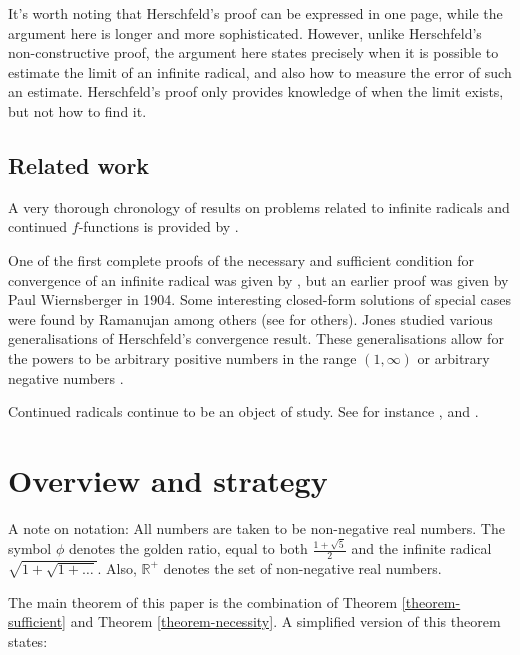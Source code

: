 \documentclass[
]{article}
\theoremstyle{theorem}
\theoremstyle{lemma}
\theoremstyle{corollary}
\theoremstyle{remark}
\theoremstyle{definition}
\begin{document}
It's worth noting that Herschfeld's proof can be expressed in one page, while the argument here is longer and more sophisticated. However, unlike Herschfeld's non-constructive proof, the argument here states precisely when it is possible to estimate the limit of an infinite radical, and also how to measure the error of such an estimate. Herschfeld's proof only provides knowledge of when the limit exists, but not how to find it.

\hypertarget{related-work}{%
\subsection{Related work}\label{related-work}}

A very thorough chronology of results on problems related to infinite radicals and continued \(f\)-functions is provided by \cite{Jones}.

One of the first complete proofs of the necessary and sufficient condition for convergence of an infinite radical was given by \cite{Hersch}, but an earlier proof was given by Paul Wiernsberger in 1904. Some interesting closed-form solutions of special cases were found by Ramanujan among others \cite{ramanujan1911} (see \cite{Jones} for others). Jones studied various generalisations of Herschfeld's convergence result. These generalisations allow for the powers to be arbitrary positive numbers \cite{Jones1995} in the range \((1,\infty)\) or arbitrary negative numbers \cite{Jones2015} .

Continued radicals continue to be an object of study. See for instance \cite{aoki2016}, \cite{doi:10.4169/amer.math.monthly.121.01.045} and \cite{Convergencemonotonicityandinequalitiesofsequencesinvolvingcontinuedpowers}.

\hypertarget{overview-and-strategy}{%
\section{Overview and strategy}\label{overview-and-strategy}}

A note on notation: All numbers are taken to be non-negative real numbers. The symbol \(\phi\) denotes the golden ratio, equal to both \(\frac{1 + \sqrt 5}{2}\) and the infinite radical \(\sqrt{1 + \sqrt{1 + \dots}}\). Also, \(\mathbb R^+\) denotes the set of non-negative real numbers.

The main theorem of this paper is the combination of Theorem \ref{theorem-sufficient} and Theorem \ref{theorem-necessity}. A simplified version of this theorem states:
\end{document}
